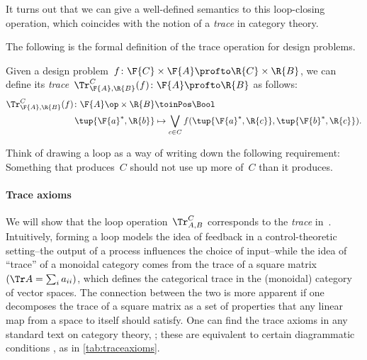 It turns out that we can give a well-defined semantics to this loop-closing operation, which coincides with the notion of a \emph{trace} in category theory.

The following is the formal definition of the trace operation for design problems.

\begin{definition}
  \label{def:dp-trace}
  Given a design problem~$f\colon \F{C} \times \F{A} \profto \R{C} \times \R{B}$, we can define
  its \emph{trace}~$\Tr_{\F{A},\R{B}}^C(f) \colon \F{A} \profto \R{B}$ as follows:
%
  \begin{equation}
    \label{eq:tracedef}
    \begin{aligned}
      \Tr_{\F{A},\R{B}}^C(f) \colon  \F{A}\op \times \R{B} &\toinPos \Bool \\
      \tup{\F{a}^*, \R{b}} &\mapsto \bigvee_{c\in C}
      f(\tup{\F{a}^*, \R{c}},
      \tup{\F{b}^*, \R{c}}).
    \end{aligned}
  \end{equation}
\end{definition}


Think of drawing a loop as a way of writing down the following requirement: Something that produces~$C$ should not use up more of~$C$ than it produces.

\paragraph{Trace axioms}
We will show that the loop operation~$\Tr_{A,B}^C$ corresponds to the \emph{trace} in~\DP.
Intuitively, forming a loop models the idea of feedback in a control-theoretic setting--the output of a process influences the choice of input--while the idea of ``trace'' of a monoidal category comes from the trace of a square matrix~$(\Tr A = \sum_i a_{ii})$, which defines the categorical trace in the (monoidal) category of vector spaces.
The connection between the two is more apparent if one decomposes the trace of a square matrix as a set of properties that any linear map from a space to itself should satisfy. One can find the trace axioms in any standard text on category theory, \eg  \cite{mac2013categories}; these are equivalent to certain diagrammatic conditions \cite{joyal96}, as in \cref{tab:traceaxioms}.


